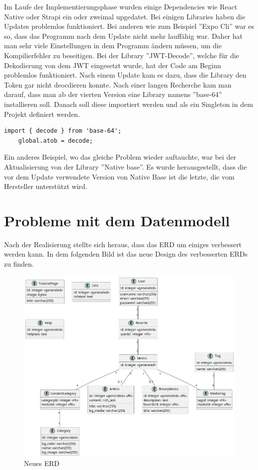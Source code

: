 Im Laufe der Implementierungsphase wurden einige Dependencies wie React Native oder Strapi ein oder zweimal upgedatet. Bei einigen Libraries haben die Updates problemlos funktioniert. Bei anderen wie zum Beispiel ''Expo Cli'' war es so, dass das Programm nach dem Update nicht mehr lauffähig war. Daher hat man sehr viele Einstellungen in dem Programm ändern müssen, um die Kompilierfehler zu beseitigen.
Bei der Library ''JWT-Decode'', welche  für die Dekodierung von dem JWT eingesetzt wurde, hat der Code am Beginn problemlos funktioniert. Nach einem Update kam es dazu, dass die Library den Token gar nicht deocdieren konnte.
Nach einer langen Recherche kam man darauf, dass man ab der vierten Version eine Library namens ''base-64'' installieren soll.
Danach soll diese importiert werden und als ein Singleton in dem Projekt definiert werden.
\begin{lstlisting}[caption=base-64 als Singleton]
    import { decode } from 'base-64';
    global.atob = decode;
    \end{lstlisting}
\cite{jwt-decode-bug}

Ein anderes Beispiel, wo das gleiche Problem wieder auftauchte, war bei der Aktualisierung von der Library ''Native base''. Es wurde herausgestellt,
dass die vor dem Update verwendete Version von Native Base ist die letzte, die vom Hersteller unterstützt wird.

\section{Probleme mit dem Datenmodell}
Nach der Realisierung stellte sich heraus, dass das ERD um einiges verbessert werden kann. In dem folgenden Bild ist das neue Design des verbesserten ERDs zu finden.
\begin{figure}[H]
    \centering
    \includegraphics[width=\textwidth]{./pics/new-erd}
    \caption{Neues ERD}
\end{figure}

